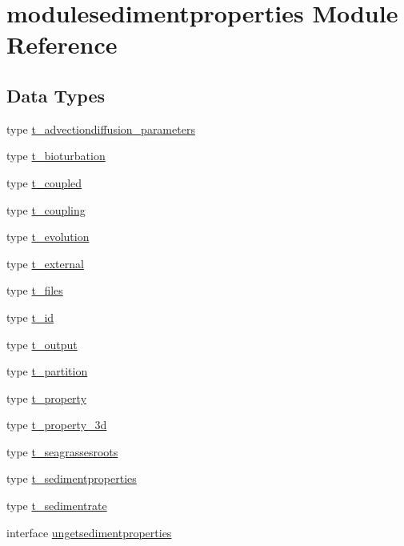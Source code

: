 \hypertarget{namespacemodulesedimentproperties}{}\section{modulesedimentproperties Module Reference}
\label{namespacemodulesedimentproperties}
\subsection*{Data Types}
\begin{DoxyCompactItemize}
\item 
type \mbox{\hyperlink{structmodulesedimentproperties_1_1t__advectiondiffusion__parameters}{t\+\_\+advectiondiffusion\+\_\+parameters}}
\item 
type \mbox{\hyperlink{structmodulesedimentproperties_1_1t__bioturbation}{t\+\_\+bioturbation}}
\item 
type \mbox{\hyperlink{structmodulesedimentproperties_1_1t__coupled}{t\+\_\+coupled}}
\item 
type \mbox{\hyperlink{structmodulesedimentproperties_1_1t__coupling}{t\+\_\+coupling}}
\item 
type \mbox{\hyperlink{structmodulesedimentproperties_1_1t__evolution}{t\+\_\+evolution}}
\item 
type \mbox{\hyperlink{structmodulesedimentproperties_1_1t__external}{t\+\_\+external}}
\item 
type \mbox{\hyperlink{structmodulesedimentproperties_1_1t__files}{t\+\_\+files}}
\item 
type \mbox{\hyperlink{structmodulesedimentproperties_1_1t__id}{t\+\_\+id}}
\item 
type \mbox{\hyperlink{structmodulesedimentproperties_1_1t__output}{t\+\_\+output}}
\item 
type \mbox{\hyperlink{structmodulesedimentproperties_1_1t__partition}{t\+\_\+partition}}
\item 
type \mbox{\hyperlink{structmodulesedimentproperties_1_1t__property}{t\+\_\+property}}
\item 
type \mbox{\hyperlink{structmodulesedimentproperties_1_1t__property__3d}{t\+\_\+property\+\_\+3d}}
\item 
type \mbox{\hyperlink{structmodulesedimentproperties_1_1t__seagrassesroots}{t\+\_\+seagrassesroots}}
\item 
type \mbox{\hyperlink{structmodulesedimentproperties_1_1t__sedimentproperties}{t\+\_\+sedimentproperties}}
\item 
type \mbox{\hyperlink{structmodulesedimentproperties_1_1t__sedimentrate}{t\+\_\+sedimentrate}}
\item 
interface \mbox{\hyperlink{interfacemodulesedimentproperties_1_1ungetsedimentproperties}{ungetsedimentproperties}}
\end{DoxyCompactItemize}
